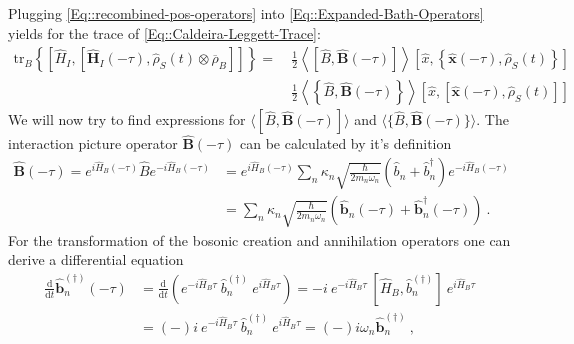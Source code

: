 	Plugging \autoref{Eq::recombined-pos-operators} into \autoref{Eq::Expanded-Bath-Operators} yields for the trace of \autoref{Eq::Caldeira-Leggett-Trace}:
	\begin{equation}
		\begin{split}
			\text{tr}_B \left\{  \left[{\hat{H}}_I, \left[{\boldsymbol{\hat{H}}}_I(- \tau), {\hat{\rho}}_S(t) \otimes \overline{\rho}_B \right]\right]  \right\} =	~&\frac{1}{2} \left\langle \left[\hat{B}, \boldsymbol{\hat{B}}(-\tau) \right]  \right \rangle \left[\hat{x}, \left\{\boldsymbol{\hat{x}}(-\tau),  \hat{\rho}_S(t)\right\}\right] \\
			& \frac{1}{2} \left\langle \left \{\hat{B}, \boldsymbol{\hat{B}}(-\tau)\right \}  \right \rangle \left[\hat{x}, \left[\boldsymbol{\hat{x}}(-\tau),  \hat{\rho}_S(t)\right] \right]
		\end{split}
	\end{equation}
	We will now try to find expressions for $\langle [\hat{B}, \boldsymbol{\hat{B}}(-\tau) ]  \rangle$ and $\langle  \{\hat{B}, \boldsymbol{\hat{B}}(-\tau) \}  \rangle$. The interaction picture operator $\boldsymbol{\hat{B}}(-\tau)$ can be calculated by it's definition
	\begin{equation}
		\begin{split}
			\boldsymbol{\hat{B}}(-\tau) =	e^{i \hat{H}_B (-\tau)} \hat{B} e^{- i \hat{H}_B (-\tau)} &=	 e^{i \hat{H}_B (-\tau)} \sum_n \kappa_n \sqrt{\frac{\hbar}{2 m_n \omega_n}} \left(\hat{b}_n + \hat{b}_n^\dagger\right) e^{- i \hat{H}_B (-\tau)} \\
			&=	\sum_n \kappa_n \sqrt{\frac{\hbar}{2 m_n \omega_n}} \left(\boldsymbol{\hat{b}}_n(-\tau) + \boldsymbol{\hat{b}}_n^\dagger(-\tau) \right)~.
		\end{split}
	\end{equation}
	For the transformation of the bosonic creation and annihilation operators one can derive a differential equation
	\begin{equation} \label{Eq::creation-annihilation-ode}
		\begin{split}
			\frac{\text{d}}{\text{d}t} \boldsymbol{\hat{b}}^{(\dagger)}_n(-\tau) &=	\frac{\text{d}}{\text{d}t} \left(e^{- i \hat{H}_B \tau}~ \hat{b}_n^{(\dagger)}~e^{ i \hat{H}_B \tau}\right) = -i~e^{- i \hat{H}_B \tau}~ \left[\hat{H}_B, \hat{b}_n^{(\dagger)}\right]~e^{i \hat{H}_B \tau} \\
			&=	(-)i~e^{- i \hat{H}_B \tau}~ \hat{b}_n^{(\dagger)}~e^{i \hat{H}_B \tau}  =	(-)i\omega_n \boldsymbol{\hat{b}}_n^{(\dagger)}~,
		\end{split}
	\end{equation}

